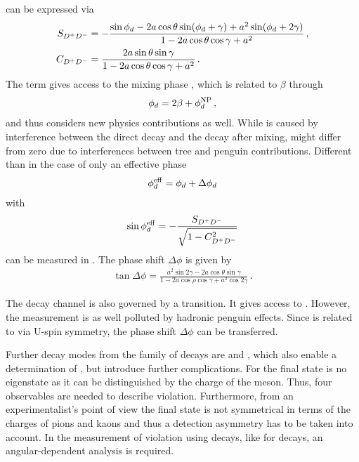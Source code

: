 can be expressed via
\begin{align}
	S_{{{D}^+}{{D}^-}} &= -\frac{\sin{\ensuremath{\phi_{{d}}}} - 2a \cos\theta\sin({\phi_{{d}}} + \gamma) + a^2\sin({\phi_{{d}}} + 2\gamma)}{1 - 2a\cos\theta\cos\gamma + a^2}\,,\\
	C_{{{D}^+}{{D}^-}} &= \frac{2a\sin\theta\sin\gamma}{1 - 2a\cos\theta\cos\gamma + a^2}\,.
\end{align}
The term \SDD gives access to the mixing phase \phid, which is related to $\beta$ through
\begin{align}
	{\ensuremath{\phi_{{d}}}} = 2\beta + \phi_d^{\mathrm{NP}}\,,
\end{align}
and thus considers new physics contributions as well. While \SDD is caused by
interference between the direct decay and the decay after mixing, \CDD
might differ from zero due to interferences between tree and penguin
contributions. Different than in the case of \BdToJPsiKS only an effective
phase
\begin{align}
	\phi_{{d}}^{\mathrm{eff}} = {\phi_{{d}}} + \Delta{\ensuremath{\phi_{{d}}}}
\end{align}
with
\begin{align}
	\sin\phi_{{d}}^{\mathrm{eff}} = -\frac{S_{{{D}^+}{{D}^-}}}{\sqrt{1 - C_{{{D}^+}{{D}^-}}^2}}
\end{align}
can be measured in \BdToDD. The phase shift $\Delta\phi$ is given by
\begin{align}
	\tan\Delta\phi = \frac{a^2\sin2\gamma - 2a\cos\theta\sin\gamma}{1 - 2a\cos\rho\cos\gamma + a^2\cos2\gamma}\,.
\end{align}

The decay channel \BsToDsDs is also governed by a \bToccbard transition. It
gives access to \phis. However, the measurement is as well polluted by
hadronic penguin effects. Since \BsToDsDs is related to \BdToDD via U-spin
symmetry, the phase shift $\Delta\phi$ can be transferred.

Further decay modes from the family of \BToDDbar decays are \BdToDstD and
\BdToDstDst, which also enable a determination of \phideff, but introduce
further complications. For \BdToDstD the final state is no \CP eigenstate as
it can be distinguished by the charge of the \Dstarpm meson. Thus, four \CP
observables are needed to describe \CP violation. Furthermore, from an
experimentalist's point of view the final state is not symmetrical in terms of
the charges of pions and kaons and thus a detection asymmetry has to be taken
into account. In the measurement of \CP violation using \BdToDstDst decays,
like for \BsToJPsiPhi decays, an angular-dependent analysis is required.
